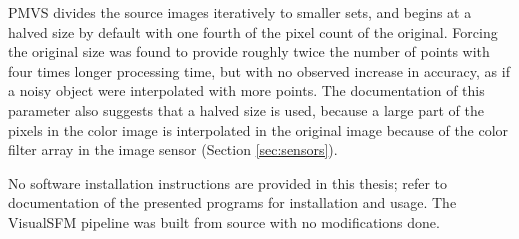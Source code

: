 PMVS divides the source images iteratively to smaller sets, and begins at a halved size by default with one fourth of the pixel count of the original.
Forcing the original size was found to provide roughly twice the number of points with four times longer processing time, but with no observed increase in accuracy, as if a noisy object were interpolated with more points.
The documentation of this parameter also suggests that a halved size is used, because a large part of the pixels in the color image is interpolated in the original image because of the color filter array in the image sensor (Section \ref{sec:sensors}).

No software installation instructions are provided in this thesis; refer to documentation of the presented programs for installation and usage.
The VisualSFM pipeline was built from source with no modifications done.

